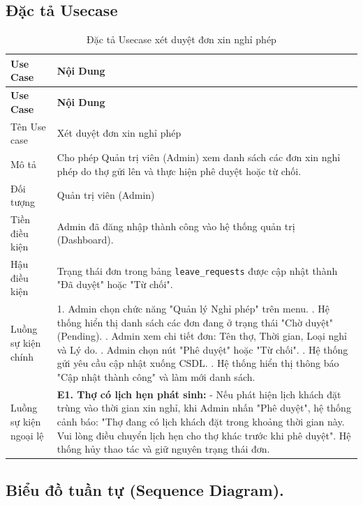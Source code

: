 \documentclass[../BTL.tex]{subfiles}
\begin{document}
\subsection{Đặc tả Usecase}
\begin{longtable}{|p{}|p{}|}
\caption{Đặc tả Usecase xét duyệt đơn xin nghỉ phép}\label{tab:usecase-xet-duyet-nghi-phep}\\
\hline
\textbf{Use Case} & \textbf{Nội Dung} \\
\hline
\endfirsthead
\hline
\textbf{Use Case} & \textbf{Nội Dung} \\
\hline
\endhead
Tên Use case & Xét duyệt đơn xin nghỉ phép \\
\hline
Mô tả & Cho phép Quản trị viên (Admin) xem danh sách các đơn xin nghỉ phép do thợ gửi lên và thực hiện phê duyệt hoặc từ chối. \\
\hline
Đối tượng & Quản trị viên (Admin) \\
\hline
Tiền điều kiện & Admin đã đăng nhập thành công vào hệ thống quản trị (Dashboard). \\
\hline
Hậu điều kiện & Trạng thái đơn trong bảng \texttt{leave\_requests} được cập nhật thành "Đã duyệt" hoặc "Từ chối". \\
\hline
Luồng sự kiện chính & 
1. Admin chọn chức năng "Quản lý Nghỉ phép" trên menu. \newline
2. Hệ thống hiển thị danh sách các đơn đang ở trạng thái "Chờ duyệt" (Pending). \newline
3. Admin xem chi tiết đơn: Tên thợ, Thời gian, Loại nghỉ và Lý do. \newline
4. Admin chọn nút "Phê duyệt" hoặc "Từ chối". \newline
5. Hệ thống gửi yêu cầu cập nhật xuống CSDL. \newline
6. Hệ thống hiển thị thông báo "Cập nhật thành công" và làm mới danh sách. \\
\hline
Luồng sự kiện ngoại lệ & 
\textbf{E1. Thợ có lịch hẹn phát sinh:} \newline
- Nếu phát hiện lịch khách đặt trùng vào thời gian xin nghỉ, khi Admin nhấn "Phê duyệt", hệ thống cảnh báo: "Thợ đang có lịch khách đặt trong khoảng thời gian này. Vui lòng điều chuyển lịch hẹn cho thợ khác trước khi phê duyệt". Hệ thống hủy thao tác và giữ nguyên trạng thái đơn. \\
\hline
\end{longtable}

\subsection{Biểu đồ tuần tự (Sequence Diagram).}
\end{document}
